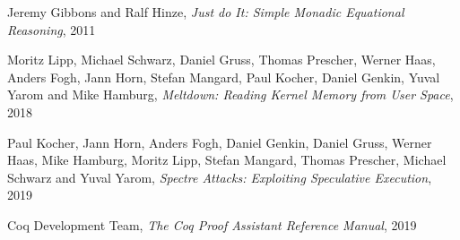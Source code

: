 \documentclass[declaration,inz,english,shortabstract]{iithesis}
\begin{document}

\begin{thebibliography}{1}

        Jeremy Gibbons and Ralf Hinze,
        \textit{Just do It: Simple Monadic Equational Reasoning},
        2011

        Moritz Lipp, Michael Schwarz, Daniel Gruss, Thomas Prescher, Werner Haas, Anders Fogh, Jann Horn, Stefan Mangard, Paul Kocher, Daniel Genkin, Yuval Yarom and Mike Hamburg,
        \textit{Meltdown: Reading Kernel Memory from User Space},
        2018

        Paul Kocher, Jann Horn, Anders Fogh, Daniel Genkin, Daniel Gruss, Werner Haas, Mike Hamburg, Moritz Lipp, Stefan Mangard, Thomas Prescher, Michael Schwarz and Yuval Yarom,
        \textit{Spectre Attacks: Exploiting Speculative Execution},
        2019
    
        Coq Development Team,
        \textit{The Coq Proof Assistant Reference Manual},
        2019

\end{thebibliography}

\end{document}
